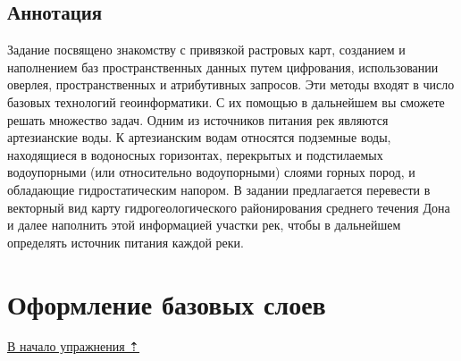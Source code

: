\documentclass[12pt,]{book}
\begin{document}
\hypertarget{map-ref-hydrogeologic-annotation}{%
\subsection{Аннотация}\label{map-ref-hydrogeologic-annotation}}

Задание посвящено знакомству с привязкой растровых карт, созданием и наполнением баз пространственных данных путем цифрования, использовании оверлея, пространственных и атрибутивных запросов. Эти методы входят в число базовых технологий геоинформатики. С их помощью в дальнейшем вы сможете решать множество задач. Одним из источников питания рек являются артезианские воды. К артезианским водам относятся подземные воды, находящиеся в водоносных горизонтах, перекрытых и подстилаемых водоупорными (или относительно водоупорными) слоями горных пород, и обладающие гидростатическим напором. В задании предлагается перевести в векторный вид карту гидрогеологического районирования среднего течения Дона и далее наполнить этой информацией участки рек, чтобы в дальнейшем определять источник питания каждой реки.

\hypertarget{map-ref-hydrogeologic-base}{%
\section{Оформление базовых слоев}\label{map-ref-hydrogeologic-base}}

\protect\hyperlink{map-ref-hydrogeologic}{В начало упражнения ⇡}
\end{document}

